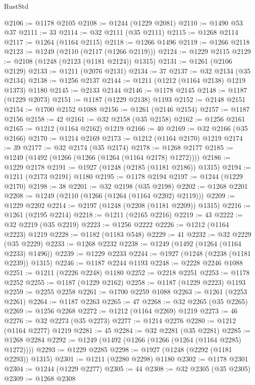 \begin{lexlean}{RustStd}
\begin{coremodule}
@2106 := @1178 @2105
@2108 := @1244 (@1229 @2081)
@2110 := @1490 @53 @37
@2111 := 33
@2114 := @32 @2111 (@35 @2111)
@2115 := @1268 @2114
@2117 := @1264 (@1164 @2115)
@2118 := @1266 @1496
@2119 := @1266 @2118
@2123 := @1249 (@2110 (@2117 (@1266 @2119)))
@2124 := @1229 @2115
@2129 := @2108 (@1248 (@2123 (@1181 @2124)) @1315)
@2131 := @1261 (@2106 @2129)
@2133 := @1211 (@2076 @2131)
@2134 := 37
@2137 := @32 @2134 (@35 @2134)
@2138 := @1256 @2137
@2144 := @1211 (@1212 (@1164 @2138) @1219 @1373) @1180
@2145 := @2133 @2144
@2146 := @1178 @2145
@2148 := @1187 (@1229 @2073)
@2151 := @1187 (@1229 @2138) @1193
@2152 := @2148 @2151
@2154 := @1700 @2152 @1088
@2156 := @1261 (@2146 @2154)
@2157 := @1187 @2156
@2158 := 42
@2161 := @32 @2158 (@35 @2158)
@2162 := @1256 @2161
@2165 := @1212 (@1164 @2162) @1219
@2166 := 40
@2169 := @32 @2166 (@35 @2166)
@2170 := @1214 @2169
@2173 := @1212 (@1164 @2170) @1219
@2174 := 39
@2177 := @32 @2174 (@35 @2174)
@2178 := @1268 @2177
@2185 := @1249 (@1492 (@1266 (@1266 (@1264 (@1164 @2178) @1272))))
@2186 := @1229 @2178
@2191 := @1927 (@1248 (@2185 (@1181 @2186)) @1315)
@2194 := @1211 (@2173 @2191) @1180
@2195 := @1178 @2194
@2197 := @1244 (@1229 @2170)
@2198 := 38
@2201 := @32 @2198 (@35 @2198)
@2202 := @1268 @2201
@2208 := @1249 (@2110 (@1266 (@1264 (@1164 @2202) @2119)))
@2209 := @1229 @2202
@2214 := @2197 (@1248 (@2208 (@1181 @2209)) @1315)
@2216 := @1261 (@2195 @2214)
@2218 := @1211 (@2165 @2216)
@2219 := 43
@2222 := @32 @2219 (@35 @2219)
@2223 := @1256 @2222
@2226 := @1212 (@1164 @2223) @1219
@2228 := @1182 (@1183 @548)
@2229 := 41
@2232 := @32 @2229 (@35 @2229)
@2233 := @1268 @2232
@2238 := @1249 (@1492 (@1264 (@1164 @2233) @1496))
@2239 := @1229 @2233
@2244 := @1927 (@1248 (@2238 (@1181 @2239)) @1315)
@2246 := @1187 @2244 @1193
@2248 := @2228 @2246 @1088
@2251 := @1211 (@2226 @2248) @1180
@2252 := @2218 @2251
@2253 := @1178 @2252
@2255 := @1187 (@1229 @2162)
@2258 := @1187 (@1229 @2223) @1193
@2259 := @2255 @2258
@2261 := @1700 @2259 @1088
@2263 := @1261 (@2253 @2261)
@2264 := @1187 @2263
@2265 := 47
@2268 := @32 @2265 (@35 @2265)
@2269 := @1256 @2268
@2272 := @1212 (@1164 @2269) @1219
@2273 := 46
@2276 := @32 @2273 (@35 @2273)
@2277 := @1214 @2276
@2280 := @1212 (@1164 @2277) @1219
@2281 := 45
@2284 := @32 @2281 (@35 @2281)
@2285 := @1268 @2284
@2292 := @1249 (@1492 (@1266 (@1266 (@1264 (@1164 @2285) @1272))))
@2293 := @1229 @2285
@2298 := @1927 (@1248 (@2292 (@1181 @2293)) @1315)
@2301 := @1211 (@2280 @2298) @1180
@2302 := @1178 @2301
@2304 := @1244 (@1229 @2277)
@2305 := 44
@2308 := @32 @2305 (@35 @2305)
@2309 := @1268 @2308

\end{coremodule}
\end{lexlean}
